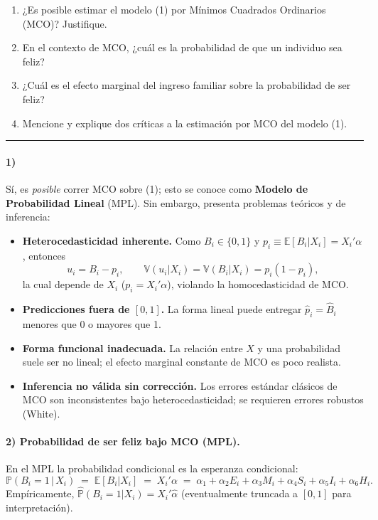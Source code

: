 \documentclass[12pt]{article}
\begin{document}
\begin{enumerate}
\item[1.] ¿Es posible estimar el modelo (1) por Mínimos Cuadrados Ordinarios (MCO)? Justifique.
\item[2.] En el contexto de MCO, ¿cuál es la probabilidad de que un individuo sea feliz?
\item[3.] ¿Cuál es el efecto marginal del ingreso familiar sobre la probabilidad de ser feliz?
\item[4.] Mencione y explique dos críticas a la estimación por MCO del modelo (1). 
\end{enumerate}

\bigskip
\hrule
\bigskip



\paragraph{1)} 
Sí, es \textit{posible} correr MCO sobre (1); esto se conoce como \textbf{Modelo de Probabilidad Lineal} (MPL). Sin embargo, presenta problemas teóricos y de inferencia:

\begin{itemize}
\item \textbf{Heterocedasticidad inherente.} Como \(B_i\in\{0,1\}\) y \(p_i\equiv \mathbb{E}[B_i|X_i]=X_i'\alpha\), entonces
\[
u_i=B_i-p_i, \qquad \mathbb{V}(u_i|X_i)=\mathbb{V}(B_i|X_i)=p_i(1-p_i),
\]
la cual depende de \(X_i\) (\(p_i=X_i'\alpha\)), violando la homocedasticidad de MCO.
\item \textbf{Predicciones fuera de \([0,1]\).} La forma lineal puede entregar \(\hat p_i=\hat B_i\) menores que 0 o mayores que 1.
\item \textbf{Forma funcional inadecuada.} La relación entre \(X\) y una probabilidad suele ser no lineal; el efecto marginal constante de MCO es poco realista.
\item \textbf{Inferencia no válida sin corrección.} Los errores estándar clásicos de MCO son inconsistentes bajo heterocedasticidad; se requieren errores robustos (White).
\end{itemize}



\paragraph{2) Probabilidad de ser feliz bajo MCO (MPL).}
En el MPL la probabilidad condicional es la esperanza condicional:
\[
\mathbb{P}(B_i=1\,|\,X_i) \;=\; \mathbb{E}[B_i|X_i] \;=\; X_i'\alpha 
\;=\; \alpha_1 + \alpha_2 E_i + \alpha_3 M_i + \alpha_4 S_i + \alpha_5 I_i + \alpha_6 H_i.
\]
Empíricamente, \(\widehat{\mathbb{P}}(B_i=1|X_i)=X_i'\hat\alpha\) (eventualmente truncada a \([0,1]\) para interpretación).
\end{document}
